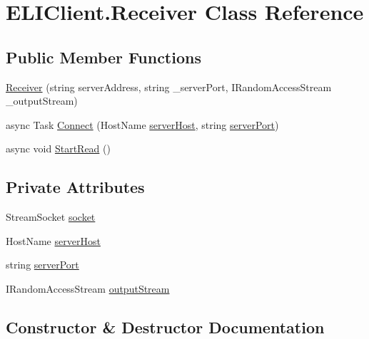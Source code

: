 \hypertarget{class_e_l_i_client_1_1_receiver}{}\section{E\+L\+I\+Client.\+Receiver Class Reference}
\label{class_e_l_i_client_1_1_receiver}
\subsection*{Public Member Functions}
\begin{DoxyCompactItemize}
\item 
\hyperlink{class_e_l_i_client_1_1_receiver_a2e444442254d91005393f02c1bbb1c11}{Receiver} (string server\+Address, string \+\_\+server\+Port, I\+Random\+Access\+Stream \+\_\+output\+Stream)
\item 
async Task \hyperlink{class_e_l_i_client_1_1_receiver_aeea41293fbaed9b944bb04c515e5837d}{Connect} (Host\+Name \hyperlink{class_e_l_i_client_1_1_receiver_a45a053863276578007c9a6b2aebc3371}{server\+Host}, string \hyperlink{class_e_l_i_client_1_1_receiver_a9ed002f0fff62e44f4e7d58c878921d2}{server\+Port})
\item 
async void \hyperlink{class_e_l_i_client_1_1_receiver_ae4bad110ef531c642ee8ab5a54640925}{Start\+Read} ()
\end{DoxyCompactItemize}
\subsection*{Private Attributes}
\begin{DoxyCompactItemize}
\item 
Stream\+Socket \hyperlink{class_e_l_i_client_1_1_receiver_aeaa24a9e1e6b6c743c663e8de711cb16}{socket}
\item 
Host\+Name \hyperlink{class_e_l_i_client_1_1_receiver_a45a053863276578007c9a6b2aebc3371}{server\+Host}
\item 
string \hyperlink{class_e_l_i_client_1_1_receiver_a9ed002f0fff62e44f4e7d58c878921d2}{server\+Port}
\item 
I\+Random\+Access\+Stream \hyperlink{class_e_l_i_client_1_1_receiver_a3560b47987460da5c12db5680019e5eb}{output\+Stream}
\end{DoxyCompactItemize}


\subsection{Constructor \& Destructor Documentation}
\mbox{\label{class_e_l_i_client_1_1_receiver_a2e444442254d91005393f02c1bbb1c11}} 

